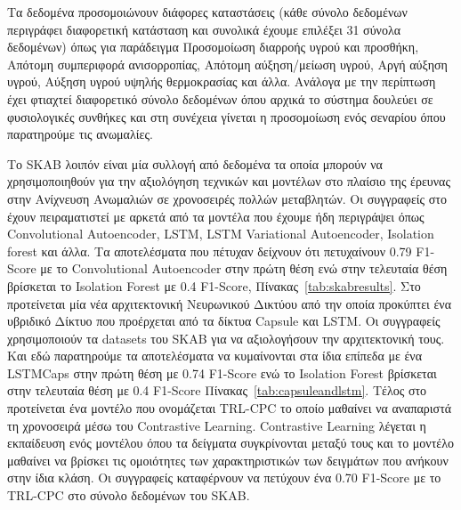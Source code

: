 \documentclass[a4paper,12pt]{report}
\theoremstyle{definitionNODot}
\begin{document}
	Τα δεδομένα προσομοιώνουν διάφορες καταστάσεις (κάθε σύνολο δεδομένων περιγράφει διαφορετική κατάσταση και συνολικά έχουμε επιλέξει 31 σύνολα δεδομένων) όπως για παράδειγμα Προσομοίωση διαρροής υγρού και προσθήκη, Απότομη συμπεριφορά ανισορροπίας, Απότομη αύξηση/μείωση υγρού, Αργή αύξηση υγρού, Αύξηση υγρού υψηλής θερμοκρασίας και άλλα. Ανάλογα με την περίπτωση έχει φτιαχτεί διαφορετικό σύνολο δεδομένων όπου αρχικά το σύστημα δουλεύει σε φυσιολογικές συνθήκες και στη συνέχεια γίνεται η προσομοίωση ενός σεναρίου όπου παρατηρούμε τις ανωμαλίες.
	
	Το SKAB λοιπόν είναι μία συλλογή από δεδομένα τα οποία μπορούν να χρησιμοποιηθούν για την αξιολόγηση τεχνικών και μοντέλων στο πλαίσιο της έρευνας στην Ανίχνευση Ανωμαλιών σε χρονοσειρές πολλών μεταβλητών. Οι συγγραφείς στο \cite{skabdataset} έχουν πειραματιστεί με αρκετά από τα μοντέλα που έχουμε ήδη περιγράψει όπως Convolutional Autoencoder, LSTM, LSTM Variational Autoencoder, Isolation forest και άλλα. Τα αποτελέσματα που πέτυχαν δείχνουν ότι πετυχαίνουν 0.79 F1-Score με το Convolutional Autoencoder στην πρώτη θέση ενώ στην τελευταία θέση βρίσκεται το Isolation Forest με 0.4 F1-Score, Πίνακας~\ref{tab:skabresults}. Στο \cite{elhalwagy2022hybridization} προτείνεται μία νέα αρχιτεκτονική Νευρωνικού Δικτύου από την οποία προκύπτει ένα υβριδικό Δίκτυο που προέρχεται από τα δίκτυα Capsule και LSTM. Οι συγγραφείς χρησιμοποιούν τα datasets του SKAB για να αξιολογήσουν την αρχιτεκτονική τους. Και εδώ παρατηρούμε τα αποτελέσματα να κυμαίνονται στα ίδια επίπεδα με ένα LSTMCaps στην πρώτη θέση με 0.74 F1-Score ενώ το Isolation Forest βρίσκεται στην τελευταία θέση με 0.4 F1-Score Πίνακας~\ref{tab:capsuleandlstm}. Τέλος στο \cite{pranavan2022contrastive} προτείνεται ένα μοντέλο που ονομάζεται TRL-CPC το οποίο μαθαίνει να αναπαριστά τη χρονοσειρά μέσω του Contrastive Learning. Contrastive Learning λέγεται η εκπαίδευση ενός μοντέλου όπου τα δείγματα συγκρίνονται μεταξύ τους και το μοντέλο μαθαίνει να βρίσκει τις ομοιότητες των χαρακτηριστικών των δειγμάτων που ανήκουν στην ίδια κλάση. Οι συγγραφείς καταφέρνουν να πετύχουν ένα  0.70 F1-Score με το TRL-CPC  στο σύνολο δεδομένων του SKAB.  
	
\end{document}
